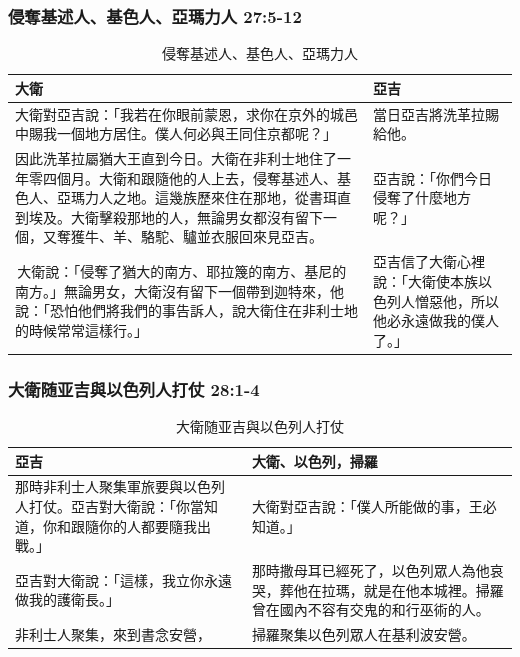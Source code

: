 \subsubsection{侵奪基述人、基色人、亞瑪力人 27:5-12}
\begin{table}[H]
\hspace*{-5mm}
\centering
\begin{tabular}{p{}|p{4.25cm}}\hline\hline
大衛&亞吉\\\hline
大衛對亞吉說：「我若在你眼前蒙恩，求你在京外的城邑中賜我一個地方居住。僕人何必與王同住京都呢？」 &當日亞吉將洗革拉賜給他。\\\hline
因此洗革拉屬猶大王直到今日。大衛在非利士地住了一年零四個月。大衛和跟隨他的人上去，侵奪基述人、基色人、亞瑪力人之地。這幾族歷來住在那地，從書珥直到埃及。大衛擊殺那地的人，無論男女都沒有留下一個，又奪獲牛、羊、駱駝、驢並衣服回來見亞吉。&亞吉說：「你們今日侵奪了什麼地方呢？」\\\hline
 大衛說：「侵奪了猶大的南方、耶拉篾的南方、基尼的南方。」無論男女，大衛沒有留下一個帶到迦特來，他說：「恐怕他們將我們的事告訴人，說大衛住在非利士地的時候常常這樣行。」&亞吉信了大衛心裡說：「大衛使本族以色列人憎惡他，所以他必永遠做我的僕人了。」\\\hline
\end{tabular}
\caption{侵奪基述人、基色人、亞瑪力人}
\end{table}


\subsubsection{大衛随亚吉與以色列人打仗 28:1-4}
\begin{table}[H]
\hspace*{-5mm}
\centering
\begin{tabular}{p{}|p{9.25cm}}\hline\hline
亞吉&大衛、以色列，掃羅\\\hline
那時非利士人聚集軍旅要與以色列人打仗。亞吉對大衛說：「你當知道，你和跟隨你的人都要隨我出戰。」&大衛對亞吉說：「僕人所能做的事，王必知道。」\\\hline
亞吉對大衛說：「這樣，我立你永遠做我的護衛長。」&那時撒母耳已經死了，以色列眾人為他哀哭，葬他在拉瑪，就是在他本城裡。掃羅曾在國內不容有交鬼的和行巫術的人。\\\hline
非利士人聚集，來到書念安營，&掃羅聚集以色列眾人在基利波安營。\\\hline
\end{tabular}
\caption{大衛随亚吉與以色列人打仗}
\end{table}


